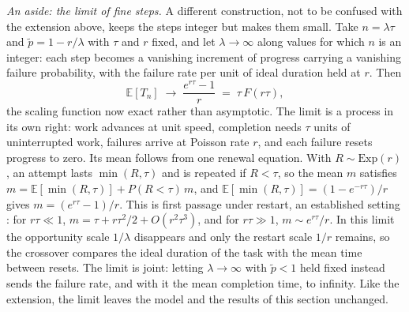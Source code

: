 \documentclass{article}
\begin{document}
\noindent\textit{An aside: the limit of fine steps.} A different construction, not to be confused with the extension above, keeps the steps integer but makes them small. Take $n = \lambda\tau$ and $\widetilde{p} = 1 - r/\lambda$ with $\tau$ and $r$ fixed, and let $\lambda \to \infty$ along values for which $n$ is an integer: each step becomes a vanishing increment of progress carrying a vanishing failure probability, with the failure rate per unit of ideal duration held at $r$. Then
\begin{equation}\label{eq:fine-step-limit}
\mathbb{E}[T_n] \;\longrightarrow\; \frac{e^{r\tau} - 1}{r} \;=\; \tau\,F(r\tau),
\end{equation}
the scaling function now exact rather than asymptotic. The limit is a process in its own right: work advances at unit speed, completion needs $\tau$ units of uninterrupted work, failures arrive at Poisson rate $r$, and each failure resets progress to zero. Its mean follows from one renewal equation. With $R \sim \mathrm{Exp}(r)$, an attempt lasts $\min(R, \tau)$ and is repeated if $R < \tau$, so the mean $m$ satisfies $m = \mathbb{E}[\min(R, \tau)] + P(R < \tau)\,m$, and $\mathbb{E}[\min(R, \tau)] = (1 - e^{-r\tau})/r$ gives $m = (e^{r\tau} - 1)/r$. This is first passage under restart, an established setting \cite{pal2017firstpassage}: for $r\tau \ll 1$, $m = \tau + r\tau^{2}/2 + O(r^{2}\tau^{3})$, and for $r\tau \gg 1$, $m \sim e^{r\tau}/r$. In this limit the opportunity scale $1/\lambda$ disappears and only the restart scale $1/r$ remains, so the crossover compares the ideal duration of the task with the mean time between resets. The limit is joint: letting $\lambda \to \infty$ with $\widetilde{p} < 1$ held fixed instead sends the failure rate, and with it the mean completion time, to infinity. Like the extension, the limit leaves the model and the results of this section unchanged.
\end{document}
